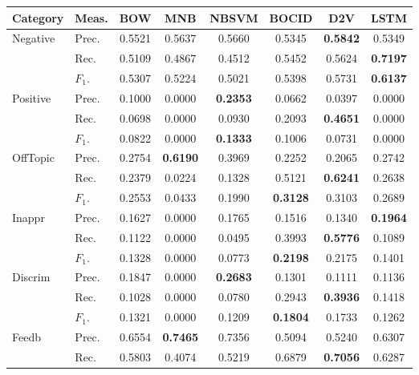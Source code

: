 \begin{tabular}{@{}l@{\hspace{2mm}}l@{\hspace{2mm}}c@{\hspace{3mm}}c@{\hspace{3mm}}c@{\hspace{3mm}}c@{\hspace{3mm}}c@{\hspace{3mm}}c@{}}
\toprule
Category & Meas. & BOW & MNB & NBSVM & BOCID & D2V & LSTM\\
\midrule
\multirow{3}{*}{Negative} & Prec. & 0.5521 & 0.5637 & 0.5660 & 0.5345 & \textbf{0.5842} & 0.5349\\
 & Rec.  & 0.5109 & 0.4867 & 0.4512 & 0.5452 & 0.5624 & \textbf{0.7197}\\
 & $F_1$. & 0.5307 & 0.5224 & 0.5021 & 0.5398 & 0.5731 & \textbf{0.6137}\\[0.5em]
\multirow{3}{*}{Positive} & Prec. & 0.1000 & 0.0000 & \textbf{0.2353} & 0.0662 & 0.0397 & 0.0000\\
 & Rec.  & 0.0698 & 0.0000 & 0.0930 & 0.2093 & \textbf{0.4651} & 0.0000\\
 & $F_1$. & 0.0822 & 0.0000 & \textbf{0.1333} & 0.1006 & 0.0731 & 0.0000\\[0.5em]
\multirow{3}{*}{OffTopic} & Prec. & 0.2754 & \textbf{0.6190} & 0.3969 & 0.2252 & 0.2065 & 0.2742\\
 & Rec.  & 0.2379 & 0.0224 & 0.1328 & 0.5121 & \textbf{0.6241} & 0.2638\\
 & $F_1$. & 0.2553 & 0.0433 & 0.1990 & \textbf{0.3128} & 0.3103 & 0.2689\\[0.5em]
\multirow{3}{*}{Inappr} & Prec. & 0.1627 & 0.0000 & 0.1765 & 0.1516 & 0.1340 & \textbf{0.1964}\\
 & Rec.  & 0.1122 & 0.0000 & 0.0495 & 0.3993 & \textbf{0.5776} & 0.1089\\
 & $F_1$. & 0.1328 & 0.0000 & 0.0773 & \textbf{0.2198} & 0.2175 & 0.1401\\[0.5em]
\multirow{3}{*}{Discrim} & Prec. & 0.1847 & 0.0000 & \textbf{0.2683} & 0.1301 & 0.1111 & 0.1136\\
 & Rec.  & 0.1028 & 0.0000 & 0.0780 & 0.2943 & \textbf{0.3936} & 0.1418\\
 & $F_1$. & 0.1321 & 0.0000 & 0.1209 & \textbf{0.1804} & 0.1733 & 0.1262\\[0.5em]
\multirow{3}{*}{Feedb} & Prec. & 0.6554 & \textbf{0.7465} & 0.7356 & 0.5094 & 0.5240 & 0.6307\\
 & Rec.  & 0.5803 & 0.4074 & 0.5219 & 0.6879 & \textbf{0.7056} & 0.6287\\

\end{tabular}
